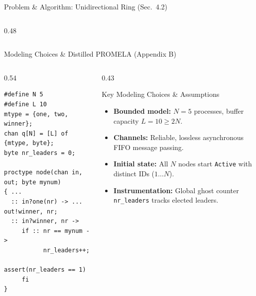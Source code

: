 \documentclass[aspectratio=169]{beamer}
\begin{document}
\begin{frame}{Problem \& Algorithm: Unidirectional Ring (Sec.\ 4.2)}
\begin{columns}[T]
\begin{column}{0.48\textwidth}
\begin{center}
      \end{center}
    \end{column}
  \end{columns}
\end{frame}

\begin{frame}[fragile]{Modeling Choices \& Distilled PROMELA (Appendix B)}
  \begin{columns}[T]
    \begin{column}{0.54\textwidth}
\begin{lstlisting}
#define N 5
#define L 10
mtype = {one, two, winner};
chan q[N] = [L] of {mtype, byte};
byte nr_leaders = 0;

proctype node(chan in, out; byte mynum)
{ ...
  :: in?one(nr) -> ... out!winner, nr;
  :: in?winner, nr ->
     if :: nr == mynum ->
           nr_leaders++;
           assert(nr_leaders == 1)
     fi
}
\end{lstlisting}
    \end{column}
    \begin{column}{0.43\textwidth}
      \begin{block}{Key Modeling Choices \& Assumptions}
        \begin{itemize}
          \item \textbf{Bounded model:} $N = 5$ processes, buffer capacity $L = 10 \ge 2N$.
          \item \textbf{Channels:} Reliable, lossless asynchronous FIFO message passing.
          \item \textbf{Initial state:} All $N$ nodes start \texttt{Active} with distinct IDs ($1\dots N$).
          \item \textbf{Instrumentation:} Global ghost counter \texttt{nr\_leaders} tracks elected leaders.
        \end{itemize}
      \end{block}
    \end{column}
  \end{columns}
\end{frame}
\end{document}

